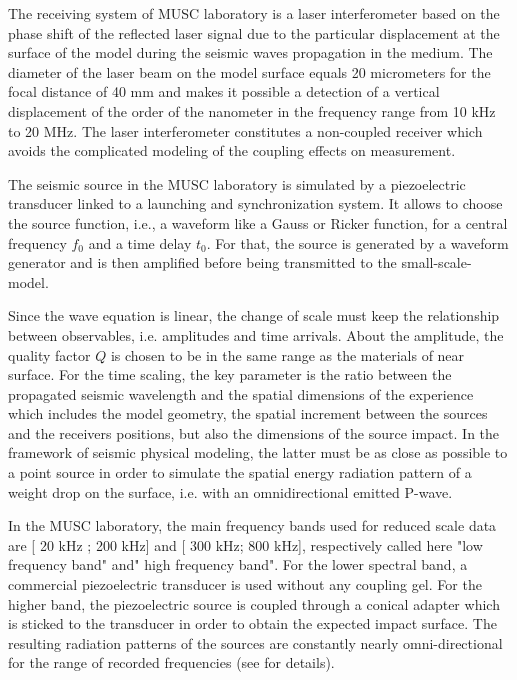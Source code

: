 \documentclass[manuscript,revised]{geophysics}
\begin{document}
\noindent The receiving system of MUSC laboratory is a laser interferometer based on the phase shift of the reflected laser signal due to the particular displacement at the surface of the model during the seismic waves propagation in the medium. The diameter of the laser beam on the model surface equals 20 micrometers for the focal distance of 40 mm and makes it possible a detection of a vertical displacement of the order of the nanometer in the frequency range from 10 kHz to 20 MHz. The laser interferometer constitutes a non-coupled receiver which avoids the complicated modeling of the coupling effects on measurement.

\noindent The seismic source in the MUSC laboratory is simulated by a piezoelectric transducer linked to a launching and synchronization system. It allows to choose the source function, i.e., a waveform like a Gauss or Ricker function, for a central frequency $f_{0}$ and a time delay $t_{0}$. For that, the source is generated by a waveform generator and is then amplified before being transmitted to the small-scale-model.

\noindent Since the wave equation is linear, the change of scale must keep the relationship between observables, i.e. amplitudes and time arrivals. About the amplitude, the quality factor $Q$ is chosen to be in the same range as the materials of near surface. For the time scaling, the key parameter is the ratio between the propagated seismic wavelength and the spatial dimensions of the experience which includes the model geometry, the spatial increment between the sources and the receivers positions, but also the dimensions of the source impact. In the framework of seismic physical modeling, the latter must be as close as possible to a point source in order to simulate the spatial energy radiation pattern of a weight drop on the surface, i.e. with an omnidirectional emitted P-wave.

\noindent In the MUSC laboratory, the main frequency bands used for reduced scale data are [ 20 kHz ; 200 kHz] and [ 300 kHz; 800 kHz], respectively called here "low frequency band" and" high frequency band". For the lower spectral band, a commercial piezoelectric transducer is used without any coupling gel. For the higher band, the piezoelectric source is coupled through a conical adapter which is sticked to the transducer in order to obtain the expected impact surface. The resulting radiation patterns of the sources are constantly nearly omni-directional for the range of recorded frequencies (see \citet{Bretaudeau_SSM_2011} for details).
\end{document}
